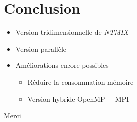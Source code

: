 \documentclass{beamer}
\begin{document}
%
%
\section{Conclusion}
\begin{frame}
  \begin{itemize}
  \item Version tridimensionnelle de \textit{NTMIX}
  \item Version parallèle
  \item Améliorations encore possibles
    \begin{itemize}
    \item Réduire la consommation mémoire
    \item Version hybride OpenMP + MPI
    \end{itemize}
  \end{itemize}

\end{frame}

\begin{frame}
  \centering Merci
  
\end{frame}
\end{document}
